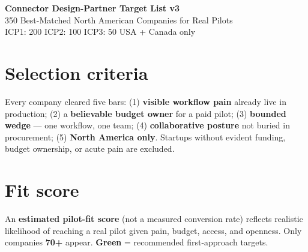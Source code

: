 \documentclass[10pt]{article}
\begin{document}
\small
\begin{center}
{\LARGE \textbf{Connector Design-Partner Target List v3}}\\[0.2em]
{\large 350 Best-Matched North American Companies for Real Pilots}\\[0.15em]
{\normalsize ICP1: 200 \textbullet{} ICP2: 100 \textbullet{} ICP3: 50 \textbullet{} USA + Canada only}
\end{center}

\section{Selection criteria}
Every company cleared five bars: (1) \textbf{visible workflow pain} already live in production; (2) a \textbf{believable budget owner} for a paid pilot; (3) \textbf{bounded wedge} --- one workflow, one team; (4) \textbf{collaborative posture} not buried in procurement; (5) \textbf{North America only}. Startups without evident funding, budget ownership, or acute pain are excluded.

\section{Fit score}
An \textbf{estimated pilot-fit score} (not a measured conversion rate) reflects realistic likelihood of reaching a real pilot given pain, budget, access, and openness. Only companies \textbf{70+} appear. \textcolor{green!50!black}{\textbf{Green}} = recommended first-approach targets.
\end{document}
